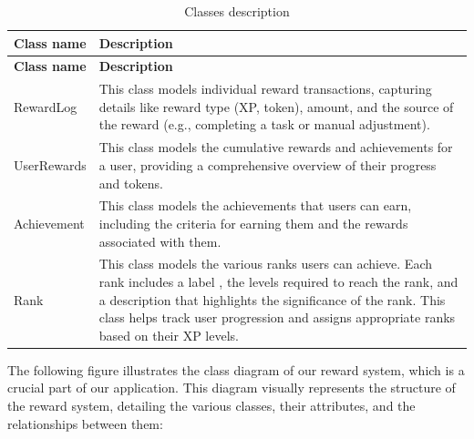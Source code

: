\begin{longtable}{ | m{} | m{} | }
    \caption{Classes description}                                                                                                               \\
    \hline
    \textbf{Class name}    & \textbf{Description}                                                                                               \\
    \hline
    \endfirsthead
    \hline
    \textbf{Class name}    & \textbf{Description}                                                                                               \\
    \hline
    \endhead
    \endfoot
    \hline
    \endlastfoot
    RewardLog                 & This class models individual reward transactions, capturing details like  reward type (XP, token), amount, and the source of the reward (e.g., completing a task or manual adjustment). \\
    \hline
    UserRewards               & This class models the cumulative rewards and achievements for a user, providing a comprehensive overview of their progress and tokens. \\
    \hline
    Achievement              & This class models the achievements that users can earn, including the criteria for earning them and the rewards associated with them. \\
    \hline
    Rank                     & This class models the various ranks users can achieve. Each rank includes a label , the levels required to reach the rank, and a description that highlights the significance of the rank. This class helps track user progression and assigns appropriate ranks based on their XP levels. \\
    \hline
\end{longtable}
The following figure illustrates the class diagram of our reward system, which is a crucial part of our application. This diagram visually represents the structure of the reward system, detailing the various classes, their attributes, and the relationships between them:


